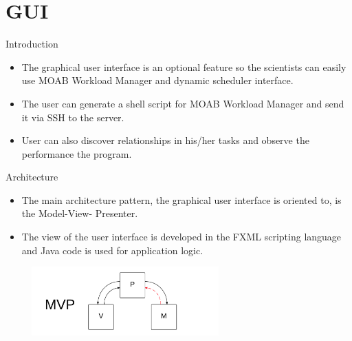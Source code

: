 \section{GUI}
	\begin{frame}{Introduction}
		\begin{itemize}
			\pause
			\item The graphical user interface is an optional feature so the scientists can easily use MOAB Workload Manager and dynamic scheduler interface. 
			\pause
			\item The user can generate a shell script for MOAB Workload Manager and send it via SSH to the server.
			\pause
			\item User can also discover relationships in his/her tasks and observe the performance the program. 
			
		\end{itemize}
	\end{frame}
	
	\begin{frame}{Architecture}
		\begin{itemize}
			\item The main architecture pattern, the graphical user interface is oriented to, is the Model-View-
Presenter. 
	        \item The view of the user interface is developed in the FXML scripting language and Java code is used for application logic.
	        
				\includegraphics[width=300px, height=100px]{images/mvp.png}
		\end{itemize}
	\end{frame}
	
	
	

